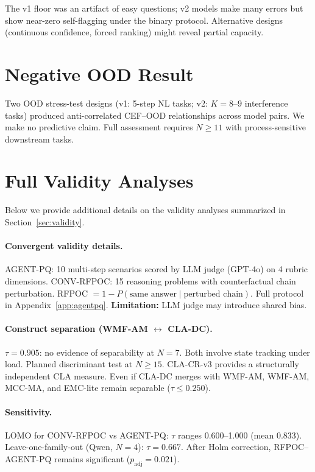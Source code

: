\documentclass{article}
\begin{document}
The v1 floor was an artifact of easy questions; v2 models make many
errors but show near-zero self-flagging under the binary protocol.
Alternative designs (continuous confidence, forced ranking) might reveal
partial capacity.

\section{Negative OOD Result}
\label{app:ood}

Two OOD stress-test designs (v1: 5-step NL tasks; v2: $K{=}8$--$9$
interference tasks) produced anti-correlated CEF--OOD relationships
across model pairs. We make no predictive claim. Full assessment requires
$N \geq 11$ with process-sensitive downstream tasks.

\section{Full Validity Analyses}
\label{app:validity}

Below we provide additional details on the validity analyses summarized in Section~\ref{sec:validity}.

\paragraph{Convergent validity details.}
AGENT-PQ: 10 multi-step scenarios scored by LLM judge (GPT-4o) on
4 rubric dimensions. CONV-RFPOC: 15 reasoning problems with
counterfactual chain perturbation. RFPOC $= 1 - P(\text{same answer}
\mid \text{perturbed chain})$. Full protocol in
Appendix~\ref{app:agentpq}.
\textbf{Limitation:} LLM judge may introduce shared bias.

\paragraph{Construct separation (WMF-AM $\leftrightarrow$ CLA-DC).}
$\tau = 0.905$: no evidence of separability at $N{=}7$. Both involve
state tracking under load. Planned discriminant test at $N \geq 15$.
CLA-CR-v3 provides a structurally independent CLA measure.
Even if CLA-DC merges with WMF-AM, WMF-AM, MCC-MA, and EMC-lite
remain separable ($\tau \leq 0.250$).

\paragraph{Sensitivity.}
LOMO for CONV-RFPOC vs AGENT-PQ: $\tau$ ranges 0.600--1.000
(mean 0.833). Leave-one-family-out (Qwen, $N{=}4$): $\tau = 0.667$.
After Holm correction, RFPOC--AGENT-PQ remains significant
($p_\text{adj} = 0.021$).
\end{document}
